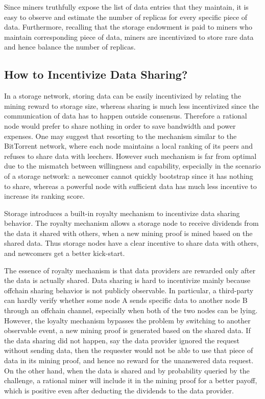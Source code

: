 Since miners truthfully expose the list of data entries that they maintain,
it is easy to observe and estimate the number of replicas for every specific piece of data.
Furthermore, recalling that the storage endowment is paid to miners who maintain corresponding piece of data,
miners are incentivized to store rare data and hence balance the number of replicas.





\subsection{How to Incentivize Data Sharing?}

In a storage network, storing data can be easily incentivized by relating the mining reward to storage size, whereas sharing is much less incentivized since the communication of data has to happen outside consensus. 
Therefore a rational node would prefer to share nothing in order to save bandwidth and power expenses.
One may suggest that resorting to the mechanism similar to the BitTorrent network, where each node maintains a local ranking of its peers and refuses to share data with leechers.
However such mechanism is far from optimal due to the mismatch between willingness and capability,
especially in the scenario of a storage network: 
a newcomer cannot quickly bootstrap since it has nothing to share, whereas a powerful node with sufficient data has much less incentive to increase its ranking score.

\projabbrev Storage introduces a built-in royalty mechanism to incentivize data sharing behavior.
The royalty mechanism allows a storage node to receive dividends 
from the data it shared with others, 
when a new mining proof is mined based on the shared data.
Thus storage nodes have a clear incentive to share data with others, and newcomers get a better kick-start.

The essence of royalty mechanism is that data providers are rewarded only after the data is actually shared.
Data sharing is hard to incentivize mainly because offchain sharing behavior is not publicly observable.
In particular, a third-party can hardly verify whether some node A sends specific data to another node B through an offchain channel,
especially when both of the two nodes can be lying.
However, the \project loyalty mechanism bypasses the problem by switching to another observable event, \ie a new mining proof is generated based on the shared data.
If the data sharing did not happen, say the data provider ignored the request without sending data, then the requester would not be able to use that piece of data in its mining proof, and hence no reward for the unanswered data request.
On the other hand, when the data is shared and by probability queried by the \sproof challenge, a rational miner will include it in the mining proof for a better payoff, which is positive even after deducting the dividends to the data provider.

